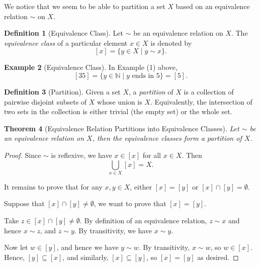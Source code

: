 \documentclass{article}
\newtheorem{theorem}{Theorem}[section]
\theoremstyle{definition}
\newtheorem{definition}[theorem]{Definition}
\newtheorem{example}[theorem]{Example}
\theoremstyle{remark}
\newcommand{\bqty}[1]{\left[#1\right]}
\newcommand{\set}[2]{\{#1\mid #2\}}
\newcommand{\NN}{\mathbb{N}}
\begin{document}
We notice that we seem to be able to partition a set \(X\) based on an equivalence relation \(\sim\) on \(X\).

\begin{definition}[Equivalence Class]
    Let \(\sim\) be an equivalence relation on \(X\). The \emph{equivalence class} of a particular element \(x \in X\) is denoted by
    \[
        \bqty{x} = \set{y \in X}{y \sim x}.
    \]
\end{definition}

\begin{example}[Equivalence Class]
    In Example (1) above,
    \[
        \bqty{35} = \set{y \in \NN}{y\text{ ends in }5} = \bqty{5}.
    \]
\end{example}

\begin{definition}[Partition]
    Given a set \(X\), a \emph{partition} of \(X\) is a collection of pairwise disjoint subsets of \(X\) whose union is \(X\). Equivalently, the intersection of two sets in the collection is either trivial (the empty set) or the whole set.
\end{definition}

\begin{theorem}[Equivalence Relation Partitions into Equivalence Classes]
    Let \(\sim\) be an equivalence relation on \(X\), then the equivalence classes form a partition of \(X\).
\end{theorem}

\begin{proof}
    Since \(\sim\) is reflexive, we have \(x \in \bqty{x}\) for all \(x \in X\). Then
    \[
        \bigcup_{x \in X} \bqty{x} = X.
    \]

    It remains to prove that for any \(x, y \in X\), either \(\bqty{x} = \bqty{y}\) or \(\bqty{x} \cap \bqty{y} = \emptyset\).

    Suppose that \(\bqty{x} \cap \bqty{y} \neq \emptyset\), we want to prove that \(\bqty{x} = \bqty{y}\).
    
    Take \(z \in \bqty{x} \cap \bqty{y} \neq \emptyset\). By definition of an equivalence relation, \(z \sim x\) and hence \(x \sim z\), and \(z \sim y\). By transitivity, we have \(x \sim y\).

    Now let \(w \in \bqty{y}\), and hence we have \(y \sim w\). By transitivity, \(x \sim w\), so \(w \in \bqty{x}\). Hence, \(\bqty{y} \subseteq \bqty{x}\), and similarly, \(\bqty{x} \subseteq \bqty{y}\), so \(\bqty{x} = \bqty{y}\) as desired.
\end{proof}
\end{document}
